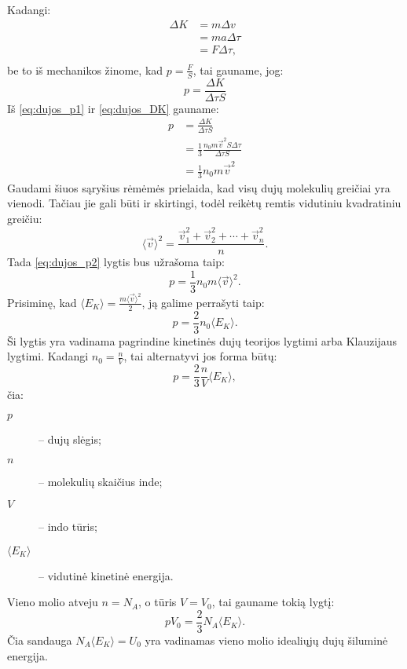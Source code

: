 Kadangi:
\begin{align*}
  \Delta K
  &= m \Delta v \\
  &= m a \Delta \tau \\
  &= F \Delta \tau, \\
\end{align*}
be to iš mechanikos žinome, kad $p = \frac{F}{S}$, tai gauname, jog:
\begin{equation}
  p = \frac{\Delta K}{\Delta \tau S}
  \label{eq:dujos_p1}
\end{equation}
Iš \ref{eq:dujos_p1} ir \ref{eq:dujos_DK} gauname:
\begin{align}
  p
  &= \frac{\Delta K}{\Delta \tau S} \\
  &= \frac{1}{3}\frac{n_{0}m\vec{v}^{2}S\Delta \tau}{\Delta \tau S} \\
  &= \frac{1}{3} n_{0} m \vec{v}^{2} \label{eq:dujos_p2}
\end{align}
Gaudami šiuos sąryšius rėmėmės prielaida, kad visų dujų molekulių
greičiai yra vienodi. Tačiau jie gali būti ir skirtingi, todėl
reikėtų remtis vidutiniu kvadratiniu greičiu:
\begin{equation*}
  \langle\vec{v}\rangle^{2} =
  \frac{\vec{v}_{1}^{2} + \vec{v}_{2}^{2} + \cdots + \vec{v}_{n}^{2}}{n}.
\end{equation*}
Tada \ref{eq:dujos_p2} lygtis bus užrašoma taip:
\begin{equation*}
  p = \frac{1}{3}n_{0}m\langle\vec{v}\rangle^{2}.
\end{equation*}
Prisiminę, kad
$\langle E_{K}\rangle = \frac{m\langle\vec{v}\rangle^{2}}{2}$, ją
galime perrašyti taip:
\begin{equation}
  p = \frac{2}{3}n_{0} \langle E_{K}\rangle.
  \label{eq:dujos_p}
\end{equation}
Ši lygtis yra vadinama pagrindine kinetinės dujų teorijos lygtimi arba
Klauzijaus lygtimi. Kadangi $n_{0} = \frac{n}{V}$, tai alternatyvi
jos forma būtų:
\begin{equation*}
  p = \frac{2}{3}\frac{n}{V} \langle E_{K}\rangle,
\end{equation*}
čia:
\begin{description}
  \item[$p$] – dujų slėgis;
  \item[$n$] – molekulių skaičius inde;
  \item[$V$] – indo tūris;
  \item[$\langle E_{K} \rangle$] – vidutinė kinetinė energija.
\end{description}
Vieno molio atveju $n=N_{A}$, o tūris $V = V_{0}$, tai gauname
tokią lygtį:
\begin{equation*}
  pV_{0} = \frac{2}{3}N_{A} \langle E_{K} \rangle.
\end{equation*}
Čia sandauga $N_{A} \langle E_{K} \rangle = U_{0}$ yra vadinamas vieno
molio idealiųjų dujų šiluminė energija.

